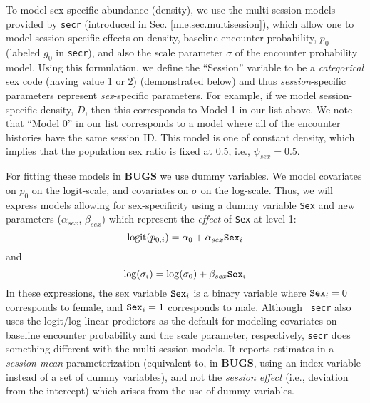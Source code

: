 To model sex-specific abundance (density), we  use the multi-session models  provided by
\mbox{\tt secr} (introduced in Sec. \ref{mle.sec.multisession}), which
allow one to model session-specific effects on density, baseline
encounter probability, $p_{0}$ (labeled $g_{0}$ in \mbox{\tt secr}), and also the scale
parameter $\sigma$ of the encounter probability model. Using this
formulation, we define the ``Session'' variable to be a {\it
  categorical} sex code (having value 1 or 2)
(demonstrated below) and
thus {\it session}-specific parameters represent {\it sex}-specific parameters.
For example, if we model session-specific density, $D$, then this
corresponds to Model 1 in our list above.  We note that ``Model 0'' in
our list corresponds to a model where all of the encounter
histories have the same session ID. This model is one of constant
density, which implies that the population sex ratio is fixed at 0.5, i.e.,
$\psi_{sex} = 0.5$. 

For fitting these models in {\bf BUGS} we use dummy variables. We
model  covariates on $p_{0}$ on
the logit-scale, and covariates on $\sigma$ on the
log-scale.
 Thus,  we will express  models allowing for sex-specificity
using a dummy variable \mbox{\tt Sex} and new parameters
($\alpha_{sex}$, $\beta_{sex}$) which
represent the {\it effect} of \mbox{\tt Sex} at level 1:
\[
 \mbox{logit}(p_{0,i}) = \alpha_{0} + \alpha_{sex} \mbox{\tt Sex}_{i}
\]
and
\[
 \mbox{log}(\sigma_{i}) = \log(\sigma_{0}) + \beta_{sex} \mbox{\tt Sex}_{i}
\]
In these expressions, the sex variable $\mbox{\tt Sex}_{i}$ is a
binary variable where $\mbox{\tt Sex}_{i}= 0$ corresponds to female,
and $\mbox{\tt Sex}_{i} = 1$ corresponds to male. Although \mbox{\tt
  secr} also uses the logit/log linear predictors as the default for
modeling covariates on baseline encounter probability and the scale
parameter, respectively, \mbox{\tt secr} does something different with
the multi-session models. It reports estimates in a {\it session mean}
parameterization (equivalent to, in {\bf BUGS}, using an index
variable instead of a set of dummy variables), and not the {\it
  session effect} (i.e., deviation from the intercept) which arises
from the use of dummy variables.


